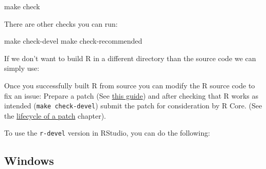 \documentclass[
  letterpaper,
  DIV=11,
  numbers=noendperiod]{scrreprt}
\newenvironment{Shaded}{\begin{snugshade}}{\end{snugshade}}
\newcommand{\AttributeTok}[1]{\textcolor[rgb]{0.40,0.45,0.13}{#1}}
\newcommand{\BuiltInTok}[1]{\textcolor[rgb]{0.00,0.23,0.31}{#1}}
\newcommand{\ExtensionTok}[1]{\textcolor[rgb]{0.00,0.23,0.31}{#1}}
\newcommand{\FunctionTok}[1]{\textcolor[rgb]{0.28,0.35,0.67}{#1}}
\newcommand{\NormalTok}[1]{\textcolor[rgb]{0.00,0.23,0.31}{#1}}
\newcommand{\OperatorTok}[1]{\textcolor[rgb]{0.37,0.37,0.37}{#1}}
\newcommand{\StringTok}[1]{\textcolor[rgb]{0.13,0.47,0.30}{#1}}
\newcommand{\VariableTok}[1]{\textcolor[rgb]{0.07,0.07,0.07}{#1}}
\begin{document}
\begin{enumerate}
\begin{Shaded}
\begin{Highlighting}[]
\FunctionTok{make}\NormalTok{ check}
\end{Highlighting}
\end{Shaded}

  There are other checks you can run:

\begin{Shaded}
\begin{Highlighting}[]
\FunctionTok{make}\NormalTok{ check{-}devel}
\FunctionTok{make}\NormalTok{ check{-}recommended}
\end{Highlighting}
\end{Shaded}
\end{enumerate}

If we don't want to build R in a different directory than the source
code we can simply use:

\begin{Shaded}
\end{Shaded}

Once you successfully built R from source you can modify the R source
code to fix an issue: Prepare a patch (See
\href{https://www.r-project.org/bugs.html\#how-to-submit-patches}{this
guide}) and after checking that R works as intended
(\texttt{make\ check-devel}) submit the patch for consideration by R
Core. (See the \hyperref[FixBug]{lifecycle of a patch} chapter).

To use the \texttt{r-devel} version in RStudio, you can do the
following:

\begin{Shaded}
\end{Shaded}

\subsection{Windows}\label{windows}
\end{document}
